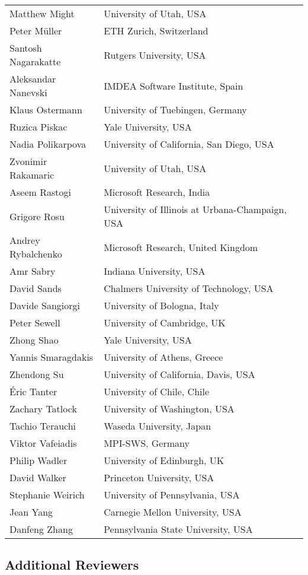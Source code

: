 \begin{tabular}{@{}p{\namewidth}l@{}}
Matthew Might
  & University of Utah, USA \\
Peter Müller
  & ETH Zurich, Switzerland \\
Santosh Nagarakatte
  & Rutgers University, USA \\
Aleksandar Nanevski
  & IMDEA Software Institute, Spain \\
Klaus Ostermann
  & University of Tuebingen, Germany \\
Ruzica Piskac
  & Yale University, USA \\
Nadia Polikarpova
  & University of California, San Diego, USA \\
Zvonimir Rakamaric
  & University of Utah, USA \\
Aseem Rastogi
  & Microsoft Research, India \\
Grigore Rosu
  & University of Illinois at Urbana-Champaign, USA\\
Andrey Rybalchenko
  & Microsoft Research, United Kingdom \\
Amr Sabry
  & Indiana University, USA \\
David Sands
  & Chalmers University of Technology, USA \\
Davide Sangiorgi
  & University of Bologna, Italy \\
Peter Sewell
  & University of Cambridge, UK \\
Zhong Shao
  & Yale University, USA \\
Yannis Smaragdakis
  & University of Athens, Greece \\
Zhendong Su
  & University of California, Davis, USA \\
Éric Tanter
  & University of Chile, Chile \\
Zachary Tatlock
  & University of Washington, USA \\
Tachio Terauchi
  & Waseda University, Japan \\
Viktor Vafeiadis
  & MPI-SWS, Germany \\
Philip Wadler
  & University of Edinburgh, UK \\
David Walker
  & Princeton University, USA \\
Stephanie Weirich
  & University of Pennsylvania, USA \\
Jean Yang
  & Carnegie Mellon University, USA \\
Danfeng Zhang
  & Pennsylvania State University, USA \\
\end{tabular}

\subsection*{\sffamily Additional Reviewers}

